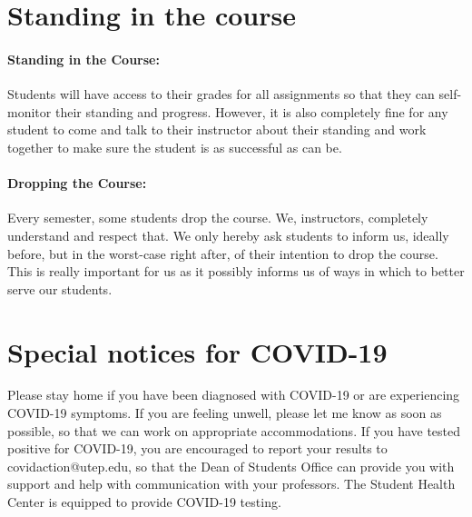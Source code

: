 
\section{Standing in the course}

\paragraph{Standing in the Course:} 

Students will have access to their grades for all assignments so that they can self-monitor their standing and progress. 
However, it is also completely fine for any student to come and talk to their instructor about their standing and work together to make sure the student is as successful as can be.

\paragraph{Dropping the Course:} 
Every semester, some students drop the course. We, instructors, completely understand and respect that. We only hereby ask students to inform us, ideally before, but in the worst-case right after, of their intention to drop the course. This is really important for us as it possibly informs us of ways in which to better serve our students.


\section{Special notices for COVID-19}

Please stay home if you have been diagnosed with COVID-19 or are experiencing COVID-19 symptoms. 
If you are feeling unwell, please let me know as soon as possible, so that we can work on appropriate accommodations. 
If you have tested positive for COVID-19, 
you are encouraged to report your results to covidaction@utep.edu, 
so that the Dean of Students Office can provide you with support and help with communication with your professors. 
The Student Health Center is equipped to provide COVID-19 testing. 
 
